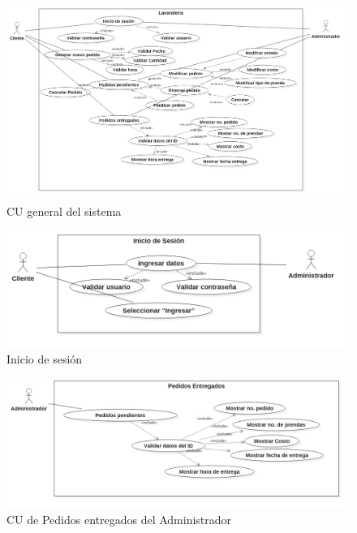 
\begin{figure}[htb]
\begin{center}
\includegraphics[width=18cm]{./imagenes/diagramas/CU_Lavanderia.png}
\end{center}
\caption{CU general del sistema}
\end{figure}


\begin{figure}[htb]
\begin{center}
\includegraphics[width=18cm]{./imagenes/diagramas/CU_IniciarSesion.png}
\end{center}
\caption{Inicio de sesión}
\end{figure}


\begin{figure}[htb]
\begin{center}
\includegraphics[width=19cm]{./imagenes/diagramas/CU_PedidosEntregados(Admin).png}
\end{center}
\caption{CU de Pedidos entregados del Administrador}
\end{figure}


